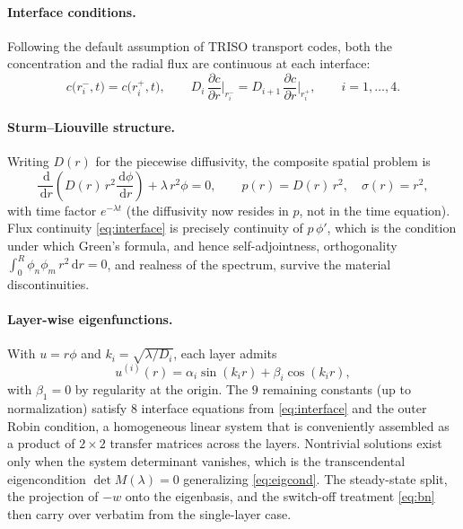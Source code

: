 \documentclass[11pt,a4paper]{article}
\newcommand{\dd}{\,\mathrm{d}}
\begin{document}
\paragraph{Interface conditions.} Following the default assumption of TRISO transport
codes, both the concentration and the radial flux are continuous at each interface:
\begin{equation}
c\big(r_i^-,t\big) = c\big(r_i^+,t\big), \qquad
D_i\,\frac{\partial c}{\partial r}\Big|_{r_i^-}
= D_{i+1}\,\frac{\partial c}{\partial r}\Big|_{r_i^+},
\qquad i = 1,\dots,4 .
\label{eq:interface}
\end{equation}

\paragraph{Sturm--Liouville structure.} Writing $D(r)$ for the piecewise diffusivity,
the composite spatial problem is
\begin{equation}
\frac{\dd}{\dd r}\!\left(D(r)\, r^2\frac{\dd\phi}{\dd r}\right) + \lambda\, r^2\phi = 0,
\qquad p(r) = D(r)\,r^2,\quad \sigma(r) = r^2,
\end{equation}
with time factor $e^{-\lambda t}$ (the diffusivity now resides in $p$, not in the time
equation). Flux continuity \eqref{eq:interface} is precisely continuity of
$p\,\phi'$, which is the condition under which Green's formula, and hence
self-adjointness, orthogonality
$\int_0^R \phi_n\phi_m\, r^2\dd r = 0$, and realness of the spectrum, survive the
material discontinuities.

\paragraph{Layer-wise eigenfunctions.} With $u = r\phi$ and
$k_i = \sqrt{\lambda/D_i}$, each layer admits
\begin{equation}
u^{(i)}(r) = \alpha_i \sin(k_i r) + \beta_i \cos(k_i r),
\end{equation}
with $\beta_1 = 0$ by regularity at the origin. The $9$ remaining constants (up to
normalization) satisfy $8$ interface equations from \eqref{eq:interface} and the outer
Robin condition, a homogeneous linear system that is conveniently assembled as a product
of $2\times 2$ transfer matrices across the layers. Nontrivial solutions exist only when
the system determinant vanishes, which is the transcendental eigencondition
$\det M(\lambda) = 0$ generalizing \eqref{eq:eigcond}. The steady-state split, the
projection of $-w$ onto the eigenbasis, and the switch-off treatment
\eqref{eq:bn} then carry over verbatim from the single-layer case.
\end{document}
